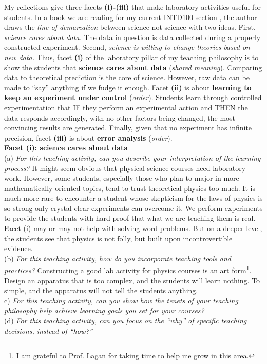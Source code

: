 \documentclass[../../../main.tex]{subfiles}
\begin{document}
My reflections give three facets \textbf{(i)-(iii)} that make laboratory activities useful for students.  In a book we are reading for my current INTD100 section \cite{scientific_attitude}, the author draws the \textit{line of demarcation} between science not science with two ideas.  First, \textit{science cares about data.}  The data in question is data collected during a properly constructed experiment.  Second, \textit{science is willing to change theories based on new data.}  Thus, facet \textbf{(i)} of the laboratory pillar of my teaching philosophy is to show the students that \textbf{science cares about data} (\textit{shared meaning}).  Comparing data to theoretical prediction is the core of science.  However, raw data can be made to ``say'' anything if we fudge it enough.  Facet \textbf{(ii)} is about \textbf{learning to keep an experiment under control} (\textit{order}).  Students learn through controlled experimentation that IF they perform an experimental action and THEN the data responds accordingly, with no other factors being changed, the most convincing results are generated.  Finally, given that no experiment has infinite precision, facet \textbf{(iii)} is about \textbf{error analysis} (\textit{order}).
\\
\vspace{0.25cm}
\textbf{Facet (i): science cares about data}
\\
\vspace{0.25cm}
(a) \textit{For this teaching activity, can you describe your interpretation of the learning process?}  It might seem obvious that physical science courses need laboratory work.  However, some students, especially those who plan to major in more mathematically-oriented topics, tend to trust theoretical physics too much.  It is much more rare to encounter a student whose skepticism for the laws of physics is so strong only crystal-clear experiments can overcome it.  We perform experiments to provide the students with hard proof that what we are teaching them is real.  Facet (i) may or may not help with solving word problems.  But on a deeper level, the students see that physics is not folly, but built upon incontrovertible evidence.
\\
\vspace{0.25cm}
(b) \textit{For this teaching activity, how do you incorporate teaching tools and practices?}  Constructing a good lab activity for physics courses is an art form\footnote{I am grateful to Prof. Lagan for taking time to help me grow in this area.}.  Design an apparatus that is too complex, and the students will learn nothing.  To simple, and the apparatus will not tell the students anything.
\\
\vspace{0.25cm}
c) \textit{For this teaching activity, can you show how the tenets of your teaching philosophy help achieve learning goals you
set for your courses?}
\\
\vspace{0.25cm}
(d) \textit{For this teaching activity, can you focus on the ``why'' of specific teaching decisions, instead of ``how?''}
\end{document}
